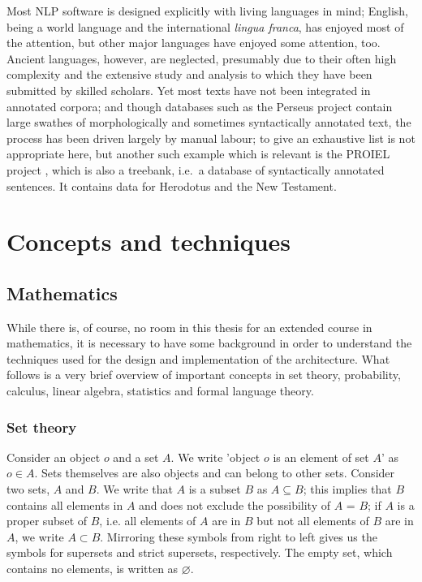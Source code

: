 Most NLP software is designed explicitly with living languages in
mind; English, being a world language and the international
\textit{lingua franca}, has enjoyed most of the attention, but other
major languages have enjoyed some attention, too. Ancient languages,
however, are neglected, presumably due to their often high complexity
and the extensive study and analysis to which they have been submitted
by skilled scholars. Yet most texts have not been integrated in
annotated corpora; and though databases such as the Perseus project
contain large swathes of morphologically and sometimes syntactically
annotated text, the process has been driven largely by manual labour;
to give an exhaustive list is not appropriate here, but another such
example which is relevant is the PROIEL project \citep{proiel}, which
is also a treebank, i.e.\ a database of syntactically annotated
sentences. It contains data for Herodotus and the New Testament.

\section{Concepts and techniques}

\subsection{Mathematics}
\label{sec:mathematics}

While there is, of course, no room in this thesis for an extended
course in mathematics, it is necessary to have some background in
order to understand the techniques used for the design and
implementation of the architecture. What follows is a very brief
overview of important concepts in set theory, probability, calculus,
linear algebra, statistics and formal language theory.

\subsubsection{Set theory}
\label{sec:settheory}

Consider an object $o$ and a set $A$. We write 'object $o$ is an
element of set $A$' as $o \in A$. Sets themselves are also objects and
can belong to other sets. Consider two sets, $A$ and $B$. We write
that $A$ is a subset $B$ as $A \subseteq B$; this implies that $B$
contains all elements in $A$ and does not exclude the possibility of
$A$ = $B$; if $A$ is a proper subset of $B$, i.e. all elements of $A$
are in $B$ but not all elements of $B$ are in $A$, we write $A \subset
B$. Mirroring these symbols from right to left gives us the symbols
for supersets and strict supersets, respectively. The empty set, which
contains no elements, is written as $\varnothing$.

